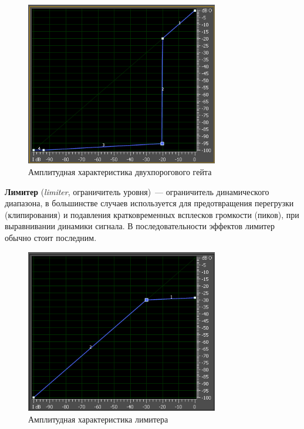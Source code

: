 \documentclass[oneside, final, 14pt]{extreport}
\begin{document}
\begin{figure}[h!]
  \centering
  \includegraphics[width=0.75\textwidth]{pic-gate-02}
  \caption{Амплитудная характеристика двухпорогового гейта}
  \label{pic-gate-02}
\end{figure}

\textbf{Лимитер} (\emph{limiter}, ограничитель уровня)~--- ограничитель динамического диапазона, в большинстве случаев используется для предотвращения перегрузки (клипирования) и подавления кратковременных всплесков громкости (пиков), при выравнивании динамики сигнала. В последовательности эффектов лимитер обычно стоит последним.

\begin{figure}[h!]
  \centering
  \includegraphics[width=0.75\textwidth]{pic-limiter-01}
  \caption{Амплитудная характеристика лимитера}
  \label{pic-limiter-01}
\end{figure}
\end{document}
